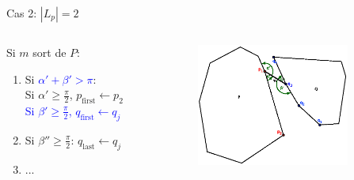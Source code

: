 \documentclass{beamer}
\begin{document}
\begin{frame}{Cas 2: $|L_p| = 2$}
	\begin{columns}[c]
	\begin{column}[T]{.5\textwidth}
		Si $m$ sort de $P$:
		\begin{enumerate}
		\item Si \textcolor{blue}{$\alpha' + \beta' > \pi$}: \\
			\hspace{0.3cm} Si $\alpha' \geq \frac{\pi}{2}$, $p_{\text{first}} \leftarrow p_{2}$\\
			\hspace{0.3cm} \textcolor{blue}{Si $\beta' \geq \frac{\pi}{2}$, $q_{\text{first}} \leftarrow q_{j}$}
		\item Si $\beta'' \geq \frac{\pi}{2}$: $q_{\text{last}} \leftarrow q_{j}$
		\item ...
		\end{enumerate}
	\end{column}
	\begin{column}[T]{.5\textwidth}
		\includegraphics[width=5cm]{dmin2_4.eps}
	\end{column}
	\end{columns}
\end{frame}
\end{document}
